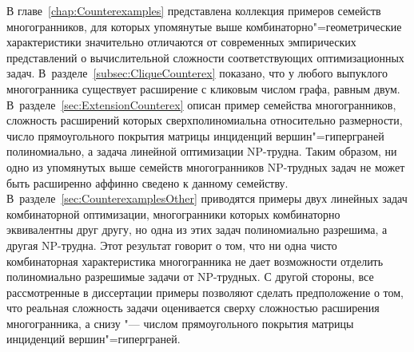 В главе~\ref{chap:Counterexamples} представлена коллекция примеров семейств многогранников, для которых упомянутые выше комбинаторно"=геометрические характеристики значительно отличаются от современных эмпирических представлений о вычислительной сложности соответствующих оптимизационных задач.
В~разделе~\ref{subsec:CliqueCounterex} показано, что у любого выпуклого многогранника существует расширение с кликовым числом графа, равным двум.
В~разделе~\ref{sec:ExtensionCounterex} описан пример семейства многогранников, сложность расширений которых сверхполиномиальна относительно размерности, число прямоугольного покрытия матрицы инциденций вершин"=гиперграней полиномиально, а задача линейной оптимизации NP-трудна. Таким образом, ни одно из упомянутых выше семейств многогранников NP-трудных задач не может быть расширенно аффинно сведено к данному семейству.
В~разделе~\ref{sec:CounterexamplesOther} приводятся примеры двух линейных задач комбинаторной оптимизации, многогранники которых комбинаторно эквивалентны друг другу, но одна из этих задач полиномиально разрешима, а другая NP-трудна.
Этот результат говорит о том, что ни одна чисто комбинаторная характеристика многогранника не дает возможности отделить полиномиально разрешимые задачи от NP-трудных. %
С другой стороны, все рассмотренные в диссертации примеры позволяют сделать предположение о том, что реальная сложность задачи оценивается сверху сложностью расширения многогранника, а снизу "--- числом прямоугольного покрытия матрицы инциденций вершин"=гиперграней.




